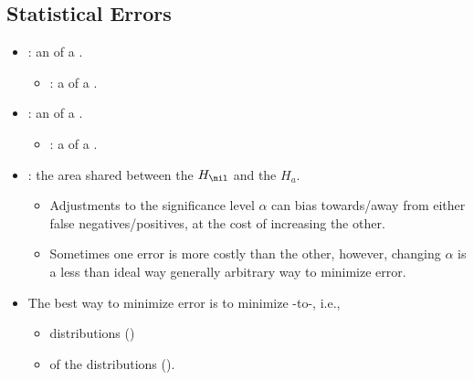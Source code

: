 \begin{itemize}
  \subsection{Statistical Errors}
  \begin{itemize}
    \item {}: an \textbf{} of a .
      \begin{itemize}
        \item {}: a  of a .
      \end{itemize}
    \item {}: an \textbf{} of a .
      \begin{itemize}
        \item {}: a  of a .
      \end{itemize}
    \item {}: the area shared between the \(H_\nil\) and the \(H_a\).
      \begin{itemize}
        \item Adjustments to the significance level \(\alpha \) can bias towards/away from either false negatives/positives, at the cost of increasing the other.
        \item Sometimes one error is more costly than the other, however, changing \(\alpha\) is a less than ideal way generally arbitrary way to minimize error.
      \end{itemize}
      \item The best way to minimize error is to minimize -to-, i.e.,
      \begin{itemize}
        \item {} distributions ()
        \item {} of the distributions ().
      \end{itemize}
    \begin{center}
    \end{center}
  \end{itemize}

\end{itemize}
